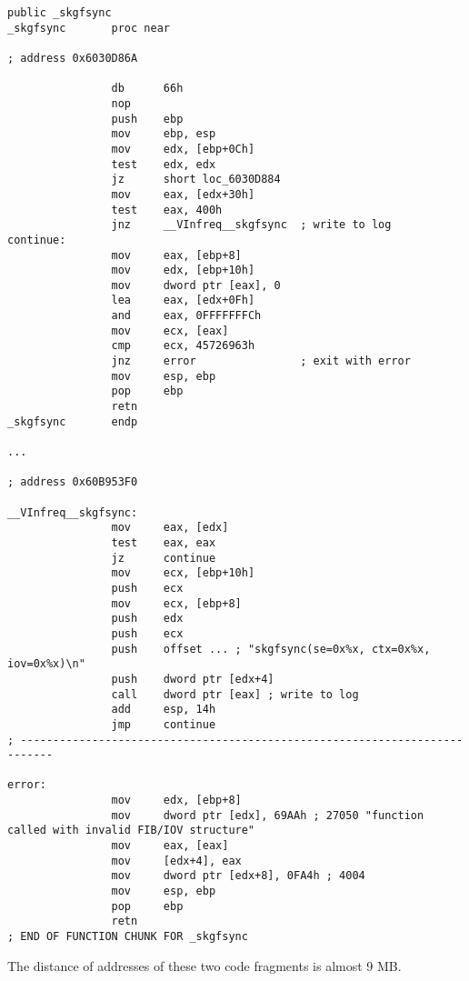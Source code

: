 \begin{lstlisting}[caption=orageneric11.dll (win32)]
                public _skgfsync
_skgfsync       proc near

; address 0x6030D86A

                db      66h
                nop
                push    ebp
                mov     ebp, esp
                mov     edx, [ebp+0Ch]
                test    edx, edx
                jz      short loc_6030D884
                mov     eax, [edx+30h]
                test    eax, 400h
                jnz     __VInfreq__skgfsync  ; write to log
continue:
                mov     eax, [ebp+8]
                mov     edx, [ebp+10h]
                mov     dword ptr [eax], 0
                lea     eax, [edx+0Fh]
                and     eax, 0FFFFFFFCh
                mov     ecx, [eax]
                cmp     ecx, 45726963h
                jnz     error                ; exit with error
                mov     esp, ebp
                pop     ebp
                retn
_skgfsync       endp

...

; address 0x60B953F0

__VInfreq__skgfsync:
                mov     eax, [edx]
                test    eax, eax
                jz      continue
                mov     ecx, [ebp+10h]
                push    ecx
                mov     ecx, [ebp+8]
                push    edx
                push    ecx
                push    offset ... ; "skgfsync(se=0x%x, ctx=0x%x, iov=0x%x)\n"
                push    dword ptr [edx+4]
                call    dword ptr [eax] ; write to log
                add     esp, 14h
                jmp     continue
; ---------------------------------------------------------------------------

error:
                mov     edx, [ebp+8]
                mov     dword ptr [edx], 69AAh ; 27050 "function called with invalid FIB/IOV structure"
                mov     eax, [eax]
                mov     [edx+4], eax
                mov     dword ptr [edx+8], 0FA4h ; 4004
                mov     esp, ebp
                pop     ebp
                retn
; END OF FUNCTION CHUNK FOR _skgfsync
\end{lstlisting}

{The distance of addresses of these two code fragments is almost 9 MB}.

